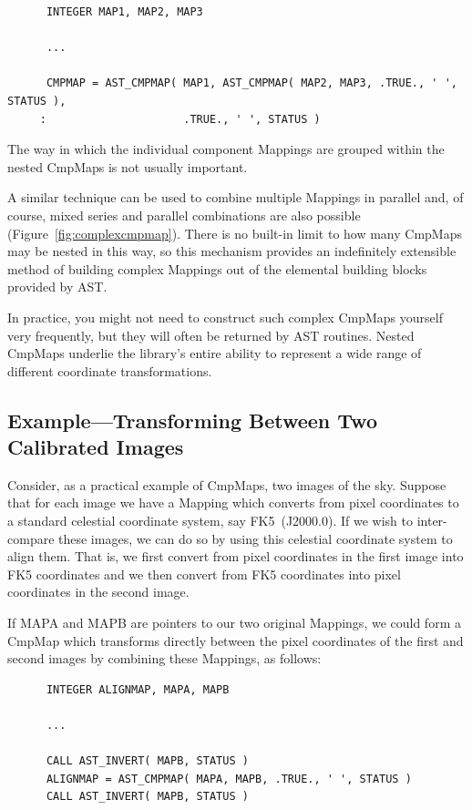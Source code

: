 \documentclass[twoside,11pt]{article}
\newcommand{\htmlref}[2]{#1}
\begin{document}
\small
\begin{verbatim}
      INTEGER MAP1, MAP2, MAP3

      ...

      CMPMAP = AST_CMPMAP( MAP1, AST_CMPMAP( MAP2, MAP3, .TRUE., ' ', STATUS ),
     :                     .TRUE., ' ', STATUS )
\end{verbatim}
\normalsize

The way in which the individual component Mappings are grouped within
the nested CmpMaps is not usually important.

A similar technique can be used to combine multiple Mappings in
parallel and, of course, mixed series and parallel combinations are
also possible (Figure~\ref{fig:complexcmpmap}).  There is no built-in
limit to how many CmpMaps may be nested in this way, so this mechanism
provides an indefinitely extensible method of building complex
Mappings out of the elemental building blocks provided by AST.

In practice, you might not need to construct such complex CmpMaps
yourself very frequently, but they will often be returned by AST
routines.  Nested CmpMaps underlie the library's entire ability to
represent a wide range of different coordinate transformations.

\subsection{\label{ss:cmpmapexample}Example---Transforming Between Two Calibrated Images}

Consider, as a practical example of CmpMaps, two images of the
sky. Suppose that for each image we have a \htmlref{Mapping}{Mapping} which converts from
pixel coordinates to a standard celestial coordinate system, say
FK5~(J2000.0). If we wish to inter-compare these images, we can do so
by using this celestial coordinate system to align them. That is, we
first convert from pixel coordinates in the first image into FK5
coordinates and we then convert from FK5 coordinates into pixel
coordinates in the second image.

If MAPA and MAPB are pointers to our two original Mappings, we could
form a \htmlref{CmpMap}{CmpMap} which transforms directly between the pixel coordinates
of the first and second images by combining these Mappings, as
follows:

\small
\begin{verbatim}
      INTEGER ALIGNMAP, MAPA, MAPB

      ...

      CALL AST_INVERT( MAPB, STATUS )
      ALIGNMAP = AST_CMPMAP( MAPA, MAPB, .TRUE., ' ', STATUS )
      CALL AST_INVERT( MAPB, STATUS )
\end{verbatim}
\normalsize
\end{document}
